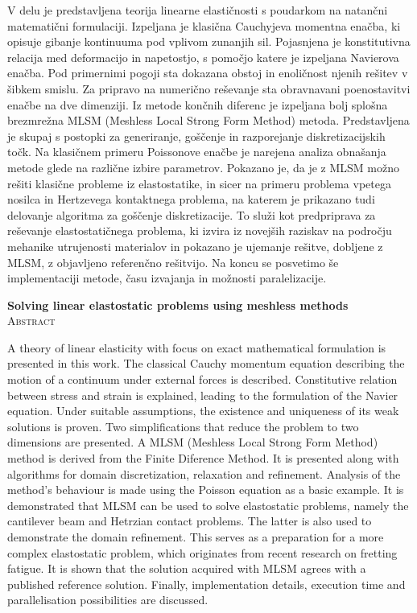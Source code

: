 \documentclass[12pt,a4paper,twoside]{article}
\theoremstyle{definition} %
\theoremstyle{plain} %
\numberwithin{equation}{section}
\begin{document}
V delu je predstavljena teorija linearne elastičnosti s poudarkom na natančni matematični
formulaciji. Izpeljana je klasična Cauchyjeva momentna enačba, ki opisuje gibanje kontinuuma pod
vplivom zunanjih sil. Pojasnjena je konstitutivna relacija med deformacijo in napetostjo, s pomočjo
katere je izpeljana Navierova enačba. Pod primernimi pogoji sta dokazana obstoj in enoličnost njenih
rešitev v šibkem smislu. Za pripravo na numerično reševanje sta obravnavani poenostavitvi enačbe na
dve dimenziji. Iz metode končnih diferenc je izpeljana bolj splošna brezmrežna MLSM (Meshless Local
Strong Form Method) metoda. Predstavljena je skupaj s postopki za generiranje, goščenje in
razporejanje diskretizacijskih točk.  Na klasičnem primeru Poissonove enačbe je narejena analiza
obnašanja metode glede na različne izbire parametrov. Pokazano je, da je z MLSM možno rešiti
klasične probleme iz elastostatike, in sicer na primeru problema vpetega nosilca in Hertzevega
kontaktnega problema, na katerem je prikazano tudi delovanje algoritma za goščenje diskretizacije.
To služi kot predpriprava za reševanje elastostatičnega problema, ki izvira iz novejših raziskav na
področju mehanike utrujenosti materialov in pokazano je ujemanje rešitve, dobljene z MLSM, z
objavljeno referenčno rešitvijo. Na koncu se posvetimo še implementaciji metode, času izvajanja in
možnosti paralelizacije.

\vfill
\begin{center}
\textbf{Solving linear elastostatic problems using meshless methods}\\[3mm] %
\textsc{Abstract} \\[2mm]
\end{center}

A theory of linear elasticity with focus on exact mathematical formulation is presented in this
work.  The classical Cauchy momentum equation describing the motion of a continuum under external
forces is described. Constitutive relation between stress and strain is explained, leading to the
formulation of the Navier equation. Under suitable assumptions, the existence and uniqueness of its
weak solutions is proven. Two simplifications that reduce the problem to two dimensions are
presented. A MLSM (Meshless Local Strong Form Method) method is derived from the Finite Diference
Method.  It is presented along with algorithms for domain discretization, relaxation and refinement.
Analysis of the method's behaviour is made using the Poisson equation as a basic example. It is
demonstrated that MLSM can be used to solve elastostatic problems, namely the cantilever beam and
Hetrzian contact problems. The latter is also used to demonstrate the domain refinement. This serves
as a preparation for a more complex elastostatic problem, which originates from recent research on
fretting fatigue.  It is shown that the solution acquired with MLSM agrees with a published
reference solution.  Finally, implementation details, execution time and parallelisation
possibilities are discussed.
\end{document}
